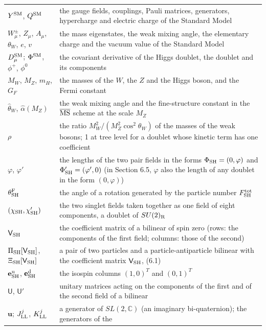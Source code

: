 \documentclass[
  10pt,
]{article}
\begin{document}
\begin{longtable}[]{@{}
  >{\raggedright\arraybackslash}p{}
  >{\raggedright\arraybackslash}p{}@{}}
\(Y^{\rm SM}\), \(Q^{\rm SM}\) & the gauge fields, couplings, Pauli
matrices, generators, hypercharge and electric charge of the Standard
Model \\
\(W^\pm_\mu\), \(Z_\mu\), \(A_\mu\), \(\theta_W\), \(e\), \(v\) & the
mass eigenstates, the weak mixing angle, the elementary charge and the
vacuum value of the Standard Model \\
\(D^{\rm SM}_\mu\); \(\Phi^{\rm SM}\), \(\phi^+\), \(\phi^0\) & the
covariant derivative of the Higgs doublet, the doublet and its
components \\
\(M_W\), \(M_Z\), \(m_H\), \(G_F\) & the masses of the \(W\), the \(Z\)
and the Higgs boson, and the Fermi constant \\
\(\hat\theta_W\), \(\hat\alpha(M_Z)\) & the weak mixing angle and the
fine-structure constant in the \(\overline{\rm MS}\) scheme at the scale
\(M_Z\) \\
\(\rho\) & the ratio \(M_W^2/(M_Z^2\cos^2\theta_W)\) of the masses of
the weak bosons; 1 at tree level for a doublet whose kinetic term has
one coefficient \\
\(\varphi\), \(\varphi'\) & the lengths of the two pair fields in the
forms \(\Phi_{\rm SH}=(0,\varphi)\) and \(\Phi'_{\rm SH}=(\varphi',0)\)
(in Section 6.5, \(\varphi\) also the length of any doublet in the form
\((0,\varphi)\)) \\
\(\theta^{\rm F}_{\rm SH}\) & the angle of a rotation generated by the
particle number \(F^{\rm tot}_{\rm SH}\) \\
\((\chi_{\rm SH},\chi'_{\rm SH})\) & the two singlet fields taken
together as one field of eight components, a doublet of
\(SU(2)_{\rm R}\) \\
\(\mathsf V_{\rm SH}\) & the coefficient matrix of a bilinear of spin
zero (rows: the components of the first field; columns: those of the
second) \\
\(\Pi_{\rm SH}[\mathsf V_{\rm SH}]\),
\(\Xi_{\rm SH}[\mathsf V_{\rm SH}]\) & a pair of two particles and a
particle-antiparticle bilinear with the coefficient matrix
\(\mathsf V_{\rm SH}\), (6.1) \\
\(\mathbf e^{\rm u}_{\rm SH}\), \(\mathbf e^{\rm d}_{\rm SH}\) & the
isospin columns \((1,0)^T\) and \((0,1)^T\) \\
\(\mathsf U\), \(\mathsf U'\) & unitary matrices acting on the
components of the first and of the second field of a bilinear \\
\(\mathbf u\); \(J^j_{\rm LL}\), \(K^j_{\rm LL}\) & a generator of
\(SL(2,\mathbb C)\) (an imaginary bi-quaternion); the generators of the

\end{longtable}
\end{document}
